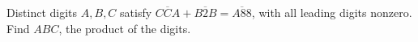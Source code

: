 Distinct digits $A,B,C$ satisfy $\overline{CCA}+\overline{B2B}=\overline{A88}$, with all leading digits nonzero. Find $ABC$, the product of the digits.
